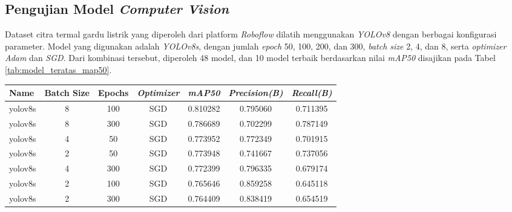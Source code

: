 \subsection{Pengujian Model \emph{Computer Vision}}
Dataset citra termal gardu listrik yang diperoleh dari platform \emph{Roboflow} dilatih menggunakan \emph{YOLOv8} dengan berbagai konfigurasi parameter. Model yang digunakan adalah \emph{YOLOv8s}, dengan jumlah \emph{epoch} 50, 100, 200, dan 300, \emph{batch size} 2, 4, dan 8, serta \emph{optimizer} \emph{Adam} dan \emph{SGD}. Dari kombinasi tersebut, diperoleh 48 model, dan 10 model terbaik berdasarkan nilai \emph{mAP50} disajikan pada Tabel \ref{tab:model_teratas_map50}.

\begin{table}[h!]
    \centering
    \begin{tabular}{|l|c|c|c|c|c|c|}
    \hline
    \textbf{Name} & \textbf{Batch Size} & \textbf{Epochs} & \textbf{\textit{Optimizer}} & \textbf{\textit{mAP50}} & \textbf{\textit{Precision(B)}} & \textbf{\textit{Recall(B)}} \\ \hline
    yolov8s       & 8                   & 100             & SGD                         & 0.810282                & 0.795060                      & 0.711395                   \\ \hline
    yolov8s       & 8                   & 300             & SGD                         & 0.786689                & 0.702299                      & 0.787149                   \\ \hline
    yolov8s       & 4                   & 50              & SGD                         & 0.773952                & 0.772349                      & 0.701915                   \\ \hline
    yolov8s       & 2                   & 50              & SGD                         & 0.773948                & 0.741667                      & 0.737056                   \\ \hline
    yolov8s       & 4                   & 300             & SGD                         & 0.772399                & 0.796335                      & 0.679174                   \\ \hline
    yolov8s       & 2                   & 100             & SGD                         & 0.765646                & 0.859258                      & 0.645118                   \\ \hline
    yolov8s       & 2                   & 300             & SGD                         & 0.764409                & 0.838419                      & 0.654519                   \\ \hline

\end{tabular}
\end{table}
